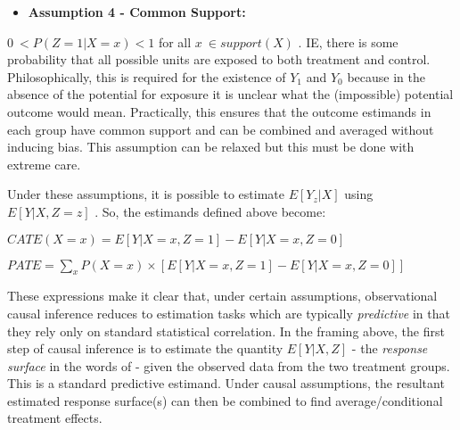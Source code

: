\documentclass[../main.tex]{subfiles}
\begin{document}
\vspace{\baselineskip}
\begin{itemize}
	\item \textbf{Assumption 4 - Common Support:}
\end{itemize}\par

\begin{adjustwidth}{0.5in}{0.0in}
 \( 0~< P \left( Z=1   \vert  X = x \right)  < 1 \) for all  \( x~ \in support \left( X \right)  \) . IE, there is some probability that all possible units are exposed to both treatment and control. Philosophically, this is required for the existence of  \( Y_{1} \) and  \( Y_{0} \) because in the absence of the potential for exposure it is unclear what the (impossible) potential outcome would mean. Practically, this ensures that the outcome estimands in each group have common support and can be combined and averaged without inducing bias. This assumption can be relaxed but this must be done with extreme care.\par

\end{adjustwidth}


\vspace{\baselineskip}
Under these assumptions, it is possible to estimate  \( E \left[ Y_{z}  \vert  X \right]  \) using  \( E \left[ Y  \vert  X, Z=z \right]  \) . So, the estimands defined above become:\par


\vspace{\baselineskip}
\begin{adjustwidth}{0.5in}{0.0in}
 \( CATE \left( X=x \right)  = E \left[ Y  \vert  X=x, Z=1 \right]  - E \left[ Y  \vert  X=x, Z=0 \right]  \) \par

\end{adjustwidth}


\vspace{\baselineskip}
\begin{adjustwidth}{0.5in}{0.0in}
 \( PATE =  \sum _{x}^{}P \left( X=x \right)   \times  \left[  E \left[ Y  \vert  X=x, Z=1 \right]  - E \left[ Y  \vert  X=x, Z=0 \right]   \right] _{} \) \par

\end{adjustwidth}


\vspace{\baselineskip}
These expressions make it clear that, under certain assumptions, observational causal inference reduces to estimation tasks which are typically \textit{predictive }in that they rely only on standard statistical correlation. In the framing above, the first step of causal inference is to estimate the quantity \( E \left[ Y  \vert  X, Z \right]  \)  - the \textit{response surface} in the words of \textcite{Hill2011BayesianInference} - given the observed data from the two treatment groups. This is a standard predictive estimand. Under causal assumptions, the resultant estimated response surface(s) can then be combined to find average/conditional treatment effects.\par
\end{document}
